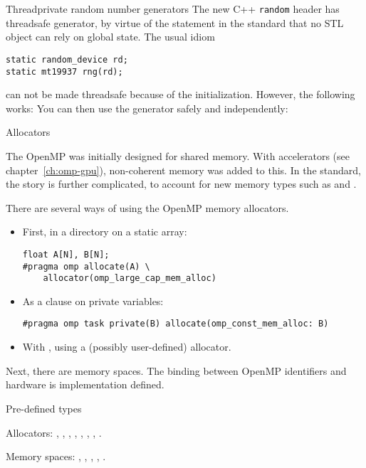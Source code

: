 \begin{cppnote}{Threadprivate random number generators}
  The new C++ \lstinline{random} header has threadsafe generator,
  by virtue of the statement in the standard that no STL object
  can rely on global state.
  The usual idiom 
\begin{lstlisting}
static random_device rd;
static mt19937 rng(rd);    
\end{lstlisting}
can not be made threadsafe because of the initialization.
However, the following works:
%
%
You can then use the generator safely and independently:
%
\end{cppnote}

 {Allocators}

The OpenMP was initially designed for shared memory.
With accelerators (see chapter~\ref{ch:omp-gpu}), non-coherent memory was added to this.
In the  standard, the story is further complicated, to account
for new memory types such as 
and .

There are several ways of using the OpenMP memory allocators.
\begin{itemize}
\item
  First, in a directory on a static array:
\begin{lstlisting}
float A[N], B[N];
#pragma omp allocate(A) \
    allocator(omp_large_cap_mem_alloc)
\end{lstlisting}
\item As a clause on private variables:
\begin{lstlisting}
#pragma omp task private(B) allocate(omp_const_mem_alloc: B)
\end{lstlisting}
\item
  With , using a (possibly user-defined) allocator.
\end{itemize}

Next, there are memory spaces. The binding between OpenMP identifiers and hardware
is implementation defined.

 {Pre-defined types}

Allocators:
,
,
,
,
,
,
,
.

Memory spaces:
,
,
,
,
.
